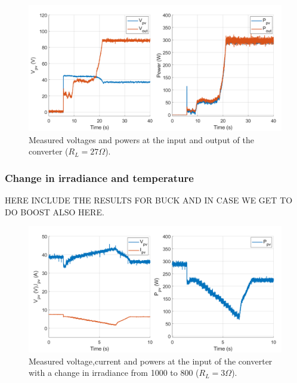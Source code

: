 \begin{figure}[H]
	\begin{center}
		\includegraphics[width=1\textwidth]{../Pictures/P1/Test/Boost_mode_MPPT_Vin_Vout_Iin_Pin_Pout}
		\caption{Measured voltages and powers at the input and output of the converter ($R_{L}=27\Omega$).}
		\label{MPPTtestboostmode2}
	\end{center}	
\end{figure}



\subsubsection*{Change in irradiance and temperature}

HERE INCLUDE THE RESULTS FOR BUCK AND IN CASE WE GET TO DO BOOST ALSO HERE. 

\begin{figure}[H]
	\begin{center}
		\includegraphics[width=1\textwidth]{../Pictures/P1/Test/Buck_mode_MPPT_Vin_Iin_Pin_irriadance_change}
		\caption{Measured voltage,current and powers at the input of the converter with a change in irradiance from 1000 to 800 ($R_{L}=3\Omega$).}
		\label{MPPTtestbuckmodeir}
	\end{center}	
\end{figure}

